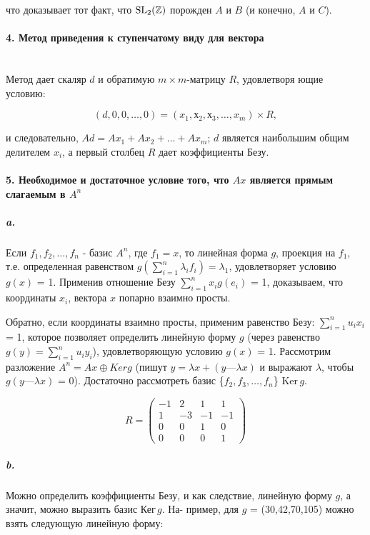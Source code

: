 {\noindent что доказывает тот факт, что $\rm{SL_{2}}(\mathbb{Z})$ порожден $A$ и $B$ (и конечно, $A$ и $C$).

\paragraph{4. Метод приведения к ступенчатому виду для вектора} \mbox{}\\

Метод дает скаляр $d$ и обратимую $m \times m$-матрицу $R$, удовлетворя ющие условию:

\begin{equation*}
(d,0,0,\ldots,0) = (x_1,х_2,х_3,\ldots,x_m) \times R,
\end{equation*}

\noindent и следовательно, $Ad = Ax_1 + Ax_2 +\ldots+ Ax_{m}$; $d$ является наибольшим общим делителем $x_{i}$, а первый столбец $R$ дает коэффициенты Безу.

\paragraph{5. Необходимое и достаточное условие того, что $Ax$ является
\;\;\;прямым слагаемым в $A^{n}$}

\subparagraph{a.} Если $f_1,f_2,\ldots,f_n$ - базис $A^{n}$, где $f_1 = x$, то линейная форма $g$, проекция на $f_1$, т.е. определенная равенством $g(\sum_{i=1}^{n} \lambda_{i}f_{i}) = \lambda_{1}$, удовлетворяет условию $g(x)$ = 1. Применив отношение Безу $\sum_{i=1}^{n} x_{i}g(e_{i})$ = 1, доказываем, что координаты $x_i$, вектора $x$ попарно взаимно просты.

Обратно, если координаты взаимно просты, применим равенство Безу: $\sum_{i=1}^{n} u_{i}x_{i}$ = 1, которое позволяет определить линейную форму $g$ (через равенство $g(y) = \sum_{i=1}^{n} u_{i}y_{i}$), удовлетворяющую условию $g(x)$ = 1. Рассмотрим разложение $A^n = Ax \oplus Ker{g}$ (пишут $y = \lambda{x} + (y — \lambda{x})$ и выражают $\lambda$, чтобы $g(y — \lambda{x})$ = 0). Достаточно рассмотреть базис \{$f_2,f_3,\ldots,f_n$\} Ker\,{$g$}.

\begin{wrapfigure}{r}{5cm}
\begin{equation*}
R = \begin{pmatrix} -1 & 2 & 1 & 1 \\ 1 & -3 & -1 & -1 \\ 0 & 0 & 1 & 0 \\ 0 & 0 & 0 & 1 \end{pmatrix}
\end{equation*}
\end{wrapfigure}
\subparagraph{b.} Можно определить коэффициенты
Безу, и как следствие, линейную форму $g$,
а значит, можно выразить базис Кег\,{$g$}. На-
пример, для $g$ = (30,42,70,105) можно
взять следующую линейную форму:

}
